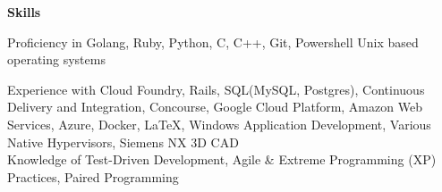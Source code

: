 \documentclass[10pt,a4papaer]{article}
\begin{document}
{		\setlength{\leftskip}{0pt}
		
		{\noindent\textbf{Skills}}\vspace*{-20px}\\
		
		\noindent\makebox[\linewidth]{\rule{\textwidth}{1.3pt}}
		
		Proficiency in Golang, Ruby, Python, C, C++, Git, Powershell Unix based operating systems\\
		
		\setlength{\leftskip}{15pt}
		
		{\noindent Experience with Cloud Foundry, Rails, SQL(MySQL, Postgres), Continuous Delivery and Integration, Concourse, Google Cloud Platform, Amazon Web Services, Azure, Docker, \LaTeX, Windows Application Development, Various Native Hypervisors, Siemens NX 3D CAD}\\
		
		{\noindent Knowledge of Test-Driven Development, Agile \& Extreme Programming (XP) Practices, Paired Programming\\}
		
		\setlength{\leftskip}{0pt}
		
		
		
	}
\end{document}

